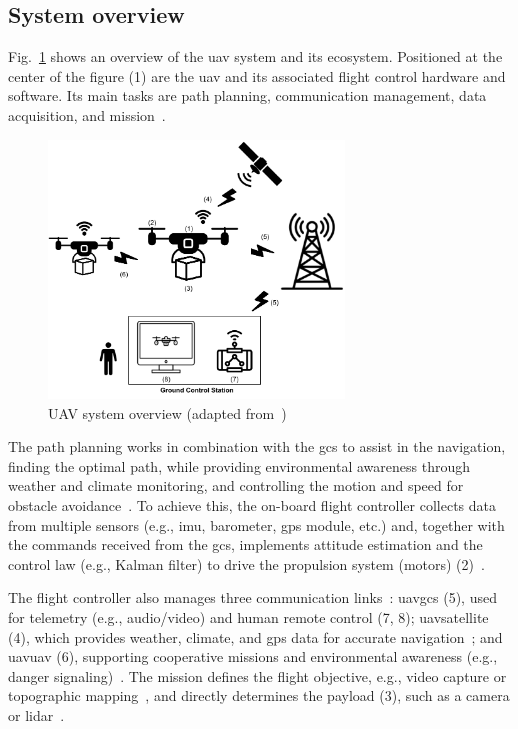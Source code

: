 \subsection{System overview}%
\label{sec:system-overview}
Fig.~\ref{fig:uav-sysOverv} shows an overview of the \gls{uav} system and its
ecosystem.
Positioned at the center of the figure (1) are the \gls{uav} and its associated flight control hardware and software.
Its main tasks are path planning, communication
management, data acquisition, and mission~\cite{aggarwal2020UAVPathPlanning}.

\begin{figure}[!hbt]
  \centering
  \includegraphics[width=0.7\textwidth]{./img/pdf/uav-sys-overv.pdf} 
%   
  \caption[UAV system overview]{UAV system overview (adapted from~\cite{mohsan2022towards,aggarwal2020UAVPathPlanning})}%
  \label{fig:uav-sysOverv}
\end{figure}

The path planning works in
combination with the \gls{gcs} to assist in the navigation, finding the optimal
path, while providing environmental awareness through weather and climate
monitoring, and controlling the motion and speed for obstacle avoidance~\cite{aggarwal2020UAVPathPlanning}. To
achieve this, the
on-board flight controller collects data from multiple sensors
(e.g., \gls{imu}, barometer, \gls{gps} module, etc.) and,
together with the commands received from the \gls{gcs}, implements attitude
estimation and the control law (e.g., Kalman filter) to drive the propulsion
system (motors) (2)~\cite{px4-sysArch}.

The flight controller also manages three communication links~\cite{aggarwal2020UAVPathPlanning}: \gls{uav}\textendash\gls{gcs} (5), used for telemetry (e.g., audio/video) and human remote control (7, 8); \gls{uav}\textendash satellite (4), which provides weather, climate, and \gls{gps} data for accurate navigation~\cite{liang_toward_2024,alvarez-vanhard_uav_2021}; and \gls{uav}\textendash\gls{uav} (6), supporting cooperative missions and environmental awareness (e.g., danger signaling)~\cite{li_distributed_2024,azari_uav--uav_2020}.
%
The mission defines the flight objective, e.g., video capture or topographic
mapping~\cite{caroti_uav-borne_2017}, and directly determines the payload (3), such as a camera or \gls{lidar}~\cite{cai_branch_2024}.

